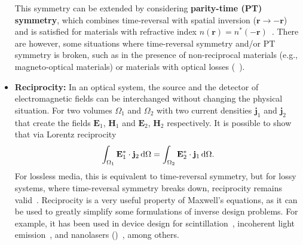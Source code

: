 \begin{itemize}
              This
              symmetry can be extended by
              considering \textbf{parity-time (PT) symmetry}, which combines time-reversal
              with spatial inversion ($\mathbf{r}\to-\mathbf{r}$) and is satisfied for
              materials with refractive index $n(\mathbf{r}) = n^*(-\mathbf{r})$~\cite{pt}. There
              are however, some situations where time-reversal symmetry and/or PT symmetry is
              broken,
              such as in the presence of
              non-reciprocal materials (e.g., magneto-optical materials) or materials with
              optical losses (~\cite{ownpub0}).

              \item \textbf{Reciprocity:} In an optical system, the source and the
              detector of electromagnetic fields can be interchanged without changing the
              physical situation. For two volumes $\Omega_1$ and
                           $\Omega_2$
              with two current densities $\mathbf{j}_1$ and $\mathbf{j}_2$ that create
              the fields $\mathbf{E}_1$, $\mathbf{H}_1$ and $\mathbf{E}_2$, $\mathbf{H}_2$
              respectively. It is possible to show that via Lorentz reciprocity~\cite{novotny}
                           \begin{equation}\label{eq:reciprocity}
                               \int_{\Omega_1} \mathbf{E}_1^* \cdot \mathbf{j}_2 \mathop{}\!\text{d} \Omega = \int_{\Omega_2}
              \mathbf{E}_2^* \cdot \mathbf{j}_1 \mathop{}\!\text{d} \Omega.
                           \end{equation}
              For lossless media, this is equivalent to time-reversal symmetry, but for
              lossy systems, where time-reversal symmetry breaks down, reciprocity remains valid~\cite{Carminati:98}. Reciprocity
              is a very useful property of Maxwell's equations, as it can be used to
              greatly simplify some formulations of inverse design problems. For example, it has been used in device design for
              scintillation~\cite{Roques_Carmes_2022}, incoherent light emission~\cite{LED_opt, Yao_2022}, and nanolasers ()~\cite{ownpub4}, among others.
    \end{itemize}


